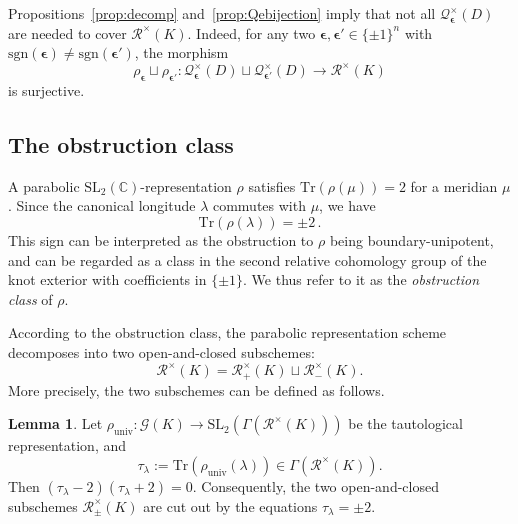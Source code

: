 \documentclass[12pt,reqno]{amsart}
\newcommand{\BC}{\mathbb{C}}
\newcommand{\calQ}{\mathcal{Q}}
\newcommand{\calG}{\mathcal{G}}
\newcommand{\calR}{\mathcal{R}}
\newcommand{\SL}{\mathrm{SL}}
\newcommand{\Tr}{\mathrm{Tr}}
\theoremstyle{definition}
\newtheorem{lemma}[theorem]{Lemma}
\begin{document}
	Propositions~\ref{prop:decomp} and~\ref{prop:Qebijection} imply that not all $\calQ^\times_{\boldsymbol{\epsilon}}(D)$ are needed to cover $\calR^\times(K)$. Indeed, for any two $\boldsymbol{\epsilon},\boldsymbol{\epsilon}' \in\{\pm1\}^n$ with $\mathrm{sgn}(\boldsymbol{\epsilon}) \neq \mathrm{sgn}(\boldsymbol{\epsilon}')$, the morphism
	\begin{equation} \label{eqn.surj}
		\rho_{\boldsymbol{\epsilon}} \sqcup \rho_{\boldsymbol{\epsilon}'} : \calQ^\times_{\boldsymbol{\epsilon}}(D) \sqcup 	\calQ^\times_{\boldsymbol{\epsilon}'}(D) \longrightarrow \calR^\times(K)
	\end{equation}
	is surjective.
	
	\subsection{The obstruction class}\label{sec:obs}
    
	A parabolic $\SL_2(\BC)$-representation $\rho$ satisfies $\Tr(\rho(\mu))=2$ for a meridian $\mu$. Since the canonical longitude $\lambda$ commutes with $\mu$, we have
	\[
	   \Tr(\rho(\lambda)) = \pm 2\,.
	\]
	This sign can be interpreted as the obstruction to $\rho$ being boundary-unipotent, and can be regarded as a class in the second relative cohomology group of the knot exterior with coefficients in $\{\pm 1\}$.  We thus refer to it as the \emph{obstruction class} of $\rho$. 
	
	According to the obstruction class, the  parabolic representation scheme decomposes into two open-and-closed subschemes:
	\[
	   \calR^\times(K) = \calR^\times_+(K) \sqcup \calR^\times_-(K).
	\]
	More precisely, the two subschemes can be defined as follows.
	\begin{lemma}\label{lem:obs} 
        Let $\rho_{\textrm{univ}} : \calG(K) \rightarrow \mathrm{SL}_2(\Gamma (\calR^\times(K)))$ be the tautological representation, and 
		\[
		      \tau_\lambda := \mathrm{Tr} (\rho_{\mathrm{univ}}(\lambda)) \in \Gamma (\calR^\times(K)).
		\]
		Then $(\tau_\lambda-2)(\tau_\lambda+2)=0$. Consequently, the two open-and-closed subschemes $\calR_\pm^\times(K)$ are cut out by the equations $\tau_\lambda = \pm 2$.
	\end{lemma}
	
\end{document}
